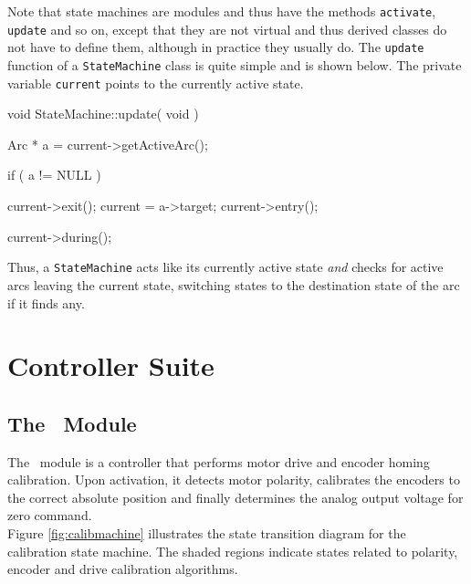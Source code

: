 \noindent Note that state machines are modules and thus have the methods
{\tt activate}, {\tt update} and so on, except that they are not virtual and
thus derived classes do not have to define them, although in practice they
usually do. The {\tt update} function of a {\tt StateMachine} class is quite
simple and is shown below. The private variable {\tt current} points to the
currently active state.

\begin{codesegment}
  void StateMachine::update( void ) {

    Arc * a = current->getActiveArc();

    if ( a != NULL ) {

      current->exit();
      current = a->target;
      current->entry();
    }

    current->during();
  }
\end{codesegment}

\noindent Thus, a {\tt StateMachine} acts like its currently active state
{\em and} checks for active arcs leaving the current state, switching states
to the destination state of the arc if it finds any.

\section{Controller Suite}

\subsection{The \CalibMachine\ Module}
\label{sec:calib_machine}

\begin{moduleheader}
\classname{\CalibMachine} \mline
\modulebase{\StateMachine} \mline
{} \mline
{}
\end{moduleheader}

The \CalibMachine\ module is a controller that performs motor drive and
encoder homing calibration. Upon activation, it detects motor polarity,
calibrates the encoders to the correct absolute position and finally
determines the analog output voltage for zero command.\\

Figure \ref{fig:calibmachine} illustrates the state transition diagram for
the calibration state machine. The shaded regions indicate states related to
polarity, encoder and drive calibration algorithms.


